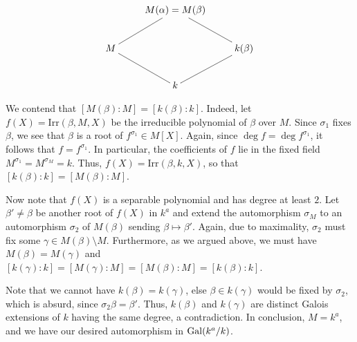 \begin{exercise}
    \begin{equation*}
        \xymatrix {
            & M(\alpha) = M(\beta)\ar@{-}[rd] & \\
            M\ar@{-}[ru]\ar@{-}[rd] & & k(\beta)\\
            & k\ar@{-}[ru] & 
        }
    \end{equation*}

    We contend that $[M(\beta) : M] = [k(\beta) : k]$. Indeed, let $f(X) = \mathrm{Irr}(\beta, M, X)$ be the irreducible polynomial of $\beta$ over $M$. Since $\sigma_1$ fixes $\beta$, we see that $\beta$ is a root of $f^{\sigma_1}\in M[X]$. Again, since $\deg f = \deg f^{\sigma_1}$, it follows that $f = f^{\sigma_1}$. In particular, the coefficients of $f$ lie in the fixed field $M^{\sigma_1} = M^{\sigma_M} = k$. Thus, $f(X) = \mathrm{Irr}(\beta, k, X)$, so that $[k(\beta) : k] = [M(\beta) : M]$.

    Now note that $f(X)$ is a separable polynomial and has degree at least $2$. Let $\beta'\ne\beta$ be another root of $f(X)$ in $k^a$ and extend the automorphism $\sigma_M$ to an automorphism $\sigma_2$ of $M(\beta)$ sending $\beta\mapsto\beta'$. Again, due to maximality, $\sigma_2$ must fix some $\gamma\in M(\beta)\setminus M$. Furthermore, as we argued above, we must have $M(\beta) = M(\gamma)$ and $[k(\gamma) : k] = [M(\gamma) : M] = [M(\beta) : M] = [k(\beta) : k]$. 

    Note that we cannot have $k(\beta) = k(\gamma)$, else $\beta\in k(\gamma)$ would be fixed by $\sigma_2$, which is absurd, since $\sigma_2\beta = \beta'$. Thus, $k(\beta)$ and $k(\gamma)$ are distinct Galois extensions of $k$ having the same degree, a contradiction. In conclusion, $M = k^a$, and we have our desired automorphism in $\operatorname{Gal}(k^a/k)$.
\end{exercise}

